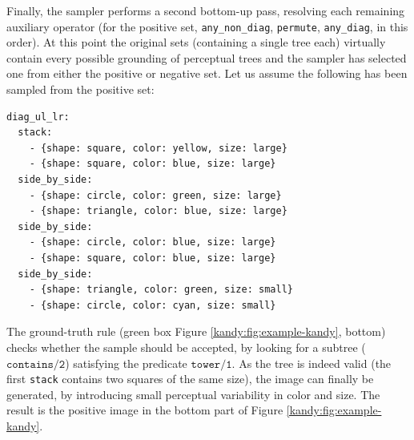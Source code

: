 %
Finally, the sampler performs a second bottom-up pass, resolving each remaining auxiliary operator (for the positive set, \texttt{any\_non\_diag}, \texttt{permute}, \texttt{any\_diag}, in this order). At this point the original sets (containing a single tree each) virtually contain every possible grounding of perceptual trees and the sampler has selected one from either the positive or negative set. Let us assume the following has been sampled from the positive set:
\vskip 2mm
\begin{verbatim}
diag_ul_lr:
  stack:
    - {shape: square, color: yellow, size: large}
    - {shape: square, color: blue, size: large}
  side_by_side:
    - {shape: circle, color: green, size: large}
    - {shape: triangle, color: blue, size: large}
  side_by_side:
    - {shape: circle, color: blue, size: large}
    - {shape: square, color: blue, size: large}
  side_by_side:
    - {shape: triangle, color: green, size: small}
    - {shape: circle, color: cyan, size: small}  
\end{verbatim}
\vskip 2mm
The ground-truth rule (green box Figure \ref{kandy:fig:example-kandy}, bottom) checks whether the sample should be accepted, by looking for a subtree ($\texttt{contains/2}$) satisfying the predicate $\texttt{tower/1}$. As the tree is indeed valid (the first \texttt{stack} contains two squares of the same size), the image can finally be generated, by introducing small perceptual variability in color and size. The result is the  positive image in the bottom part of Figure \ref{kandy:fig:example-kandy}.






